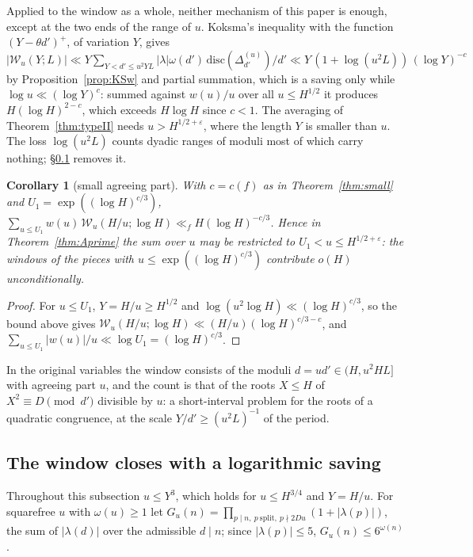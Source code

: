 \documentclass[11pt,a4paper]{article}
\newtheorem{corollary}[theorem]{Corollary}
\theoremstyle{remark}\newtheorem{remark}[theorem]{Remark}
\begin{document}
Applied to the window as a whole, neither mechanism of this paper is enough, except at the two ends of the range of $u$.
Koksma's inequality with the function $(Y-\theta d')^+$, of variation $Y$, gives
$|\mathcal W_u(Y;L)|\ll Y\sum_{Y<d'\le u^2YL}|\lambda|\omega(d')\,\mathrm{disc}(\Delta^{(u)}_{d'})/d'\ll Y\,(1+\log(u^2L))\,(\log Y)^{-c}$
by Proposition~\ref{prop:KSw} and partial summation, which is a saving only while $\log u\ll(\log Y)^{c}$: summed
against $w(u)/u$ over all $u\le H^{1/2}$ it produces $H(\log H)^{2-c}$, which exceeds $H\log H$ since $c<1$. The
averaging of Theorem~\ref{thm:typeII} needs $u>H^{1/2+\varepsilon}$, where the length $Y$ is smaller than $u$. The loss $\log(u^2L)$ counts dyadic ranges of moduli most of which
carry nothing; \S\ref{sec:closed} removes it.

\begin{corollary}[small agreeing part]\label{cor:smallu}
With $c=c(f)$ as in Theorem~\ref{thm:small} and $U_1=\exp((\log H)^{c/3})$,
$\sum_{u\le U_1}w(u)\,\mathcal W_u(H/u;\log H)\ll_fH(\log H)^{-c/3}$. Hence in Theorem~\ref{thm:Aprime} the sum over $u$
may be restricted to $U_1<u\le H^{1/2+\varepsilon}$: the windows of the pieces with $u\le\exp((\log H)^{c/3})$ contribute
$o(H)$ unconditionally.
\end{corollary}
\begin{proof}
For $u\le U_1$, $Y=H/u\ge H^{1/2}$ and $\log(u^2\log H)\ll(\log H)^{c/3}$, so the bound above gives
$\mathcal W_u(H/u;\log H)\ll(H/u)(\log H)^{c/3-c}$, and $\sum_{u\le U_1}|w(u)|/u\ll\log U_1=(\log H)^{c/3}$.
\end{proof} In the original variables the window consists of the moduli $d=ud'\in(H,u^2HL]$ with agreeing part
$u$, and the count is that of the roots $X\le H$ of $X^2\equiv D\pmod{d'}$ divisible by $u$: a short-interval
problem for the roots of a quadratic congruence, at the scale $Y/d'\ge(u^2L)^{-1}$ of the period.

\subsection{The window closes with a logarithmic saving}\label{sec:closed}

Throughout this subsection $u\le Y^3$, which holds for $u\le H^{3/4}$ and $Y=H/u$. For squarefree $u$ with $\omega(u)\ge1$
let $G_u(n)=\prod_{p\mid n,\ p\ \mathrm{split},\ p\nmid 2Du}(1+|\lambda(p)|)$, the sum of $|\lambda(d)|$ over the admissible
$d\mid n$; since $|\lambda(p)|\le5$, $G_u(n)\le6^{\omega(n)}$.
\end{document}
